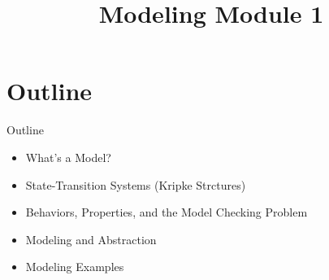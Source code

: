 \documentclass{beamer}
\title{Modeling Module 1}
\begin{document}
\begin{frame}
  \titlepage
\end{frame}


\section{Outline}


\begin{frame}{Outline}
\begin{itemize}
\item What's a Model?

\item State-Transition Systems (Kripke Strctures)

\item Behaviors, Properties, and the Model Checking Problem

\item Modeling and Abstraction

\item Modeling Examples
\end{itemize}

\end{frame}

\begin{frame}{}
\end{frame}

\begin{frame}{}

\end{frame}

\begin{frame}{}

\end{frame}
\end{document}
